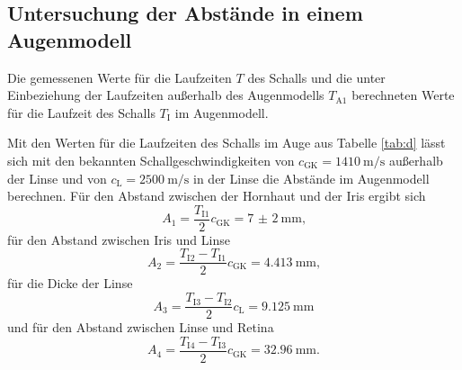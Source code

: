 \subsection{Untersuchung der Abstände in einem Augenmodell}
\begin{table}
	\centering
	\caption{Die gemessenen Werte für die Laufzeiten $T$ des Schalls und die unter Einbeziehung der Laufzeiten außerhalb des Augenmodells $T_{\text{A}1}$ berechneten Werte für die Laufzeit des Schalls $T_\text{I}$ im Augenmodell.}
	
\end{table}
Mit den Werten für die Laufzeiten des Schalls im Auge aus Tabelle \ref{tab:d} lässt sich mit den bekannten Schallgeschwindigkeiten von $c_\text{GK}=\SI{1410}{\meter\per\second}$ außerhalb der Linse und von $c_\text{L}=\SI{2500}{\meter\per\second}$ in der Linse die Abstände im Augenmodell berechnen. Für den Abstand zwischen der Hornhaut und der Iris ergibt sich
\begin{equation}
A_1=\frac{T_{\text{I}1}}{2 } c_\text{GK}=\SI{7(2)}{\milli\meter}\text{,}
\end{equation}
für den Abstand zwischen Iris und Linse
\begin{equation}
A_2=\frac{T_{\text{I}2}-T_{\text{I}1}}{2 }c_\text{GK}=\SI{4.413}{\milli\meter}\text{,}
\end{equation}
für die Dicke der Linse
\begin{equation}
A_3=\frac{T_{\text{I}3}-T_{\text{I}2}}{2 }c_\text{L}=\SI{9.125}{\milli\meter}
\end{equation}
und für den Abstand zwischen Linse und Retina 
\begin{equation}
A_4=\frac{T_{\text{I}4}-T_{\text{I}3}}{2} c_\text{GK}=\SI{32.96}{\milli\meter}\text{.}
\end{equation}



